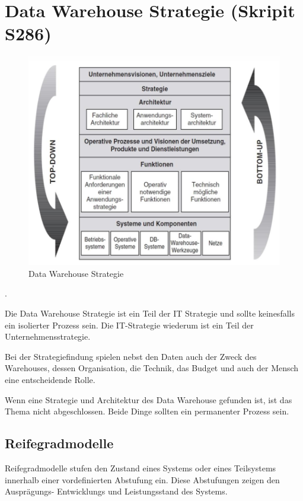 \documentclass[a4paper, 11pt, nofootinbib]{article}
\begin{document}
\section{Data Warehouse Strategie (Skripit S286)}
\begin{figure}
	\centering
	\includegraphics[keepaspectratio=true,height=18\baselineskip]{DWH_Strategie.PNG}
	\caption{Data Warehouse Strategie}
	\label{label}
\end{figure}
.
\vspace{40px}

Die Data Warehouse Strategie ist ein Teil der IT Strategie und sollte keinesfalls ein isolierter Prozess sein. Die IT-Strategie wiederum ist ein Teil der Unternehmensstrategie.

Bei der Strategiefindung spielen nebst den Daten auch der Zweck des Warehouses, dessen Organisation, die Technik, das Budget und auch der Mensch eine entscheidende Rolle. 

Wenn eine Strategie und Architektur des Data Warehouse gefunden ist, ist das Thema nicht abgeschlossen. Beide Dinge sollten ein permanenter Prozess sein.

\subsection{Reifegradmodelle}
Reifegradmodelle stufen den Zustand eines Systems oder eines Teilsystems innerhalb einer vordefinierten Abstufung ein. Diese Abstufungen zeigen den Ausprägungs- Entwicklungs und Leistungsstand des Systems.
\end{document}
